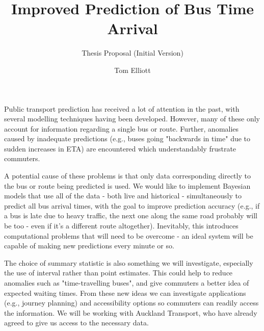 \documentclass[a4paper,twoside,12px]{article}
\title{Improved Prediction of Bus Time Arrival}
\author{Thesis Proposal (Initial Version)}
\date{Tom Elliott}
\begin{document}
\maketitle


Public transport prediction has received a lot of attention in the past, with several modelling
techniques having been developed.  However, many of these only account for information regarding a
single bus or route.  Further, anomalies caused by inadequate predictions (e.g., buses going
"backwards in time" due to sudden increases in ETA) are encountered which understandably frustrate
commuters.

A potential cause of these problems is that only data corresponding directly to the bus or route
being predicted is used. We would like to implement Bayesian models that use all of the data - both
live and historical - simultaneously to predict all bus arrival times, with the goal to improve
prediction accuracy (e.g., if a bus is late due to heavy traffic, the next one along the same road
probably will be too - even if it's a different route altogether). Inevitably, this introduces
computational problems that will need to be overcome - an ideal system will be capable of making new
predictions every minute or so.

The choice of summary statistic is also something we will investigate, especially the use of
interval rather than point estimates. This could help to reduce anomalies such as "time-travelling
buses", and give commuters a better idea of expected waiting times. From these new ideas we
can investigate applications (e.g., journey planning) and accessibility options so commuters can
readily access the information. We will be working with Auckland Transport, who have already
agreed to give us access to the necessary data.
\end{document}
